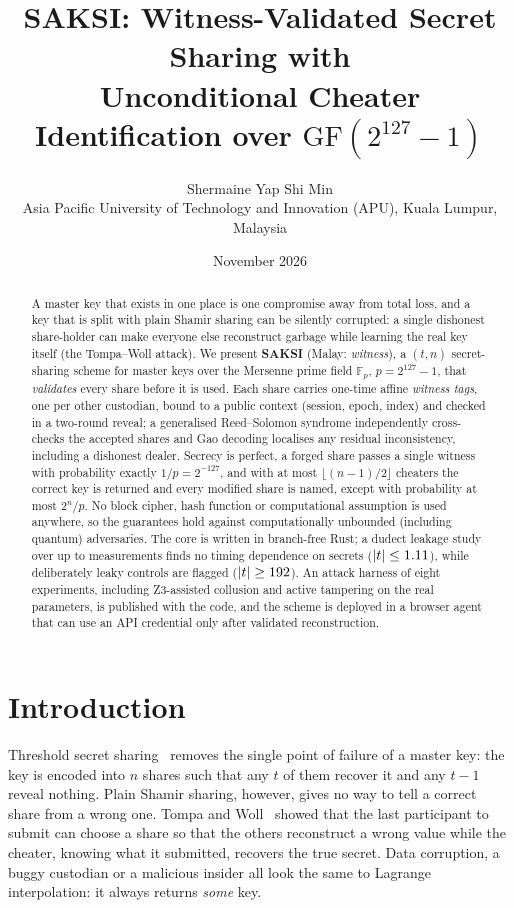 \documentclass[11pt,a4paper]{article}
\title{\textbf{SAKSI}: Witness-Validated Secret Sharing with\\Unconditional Cheater Identification over $\mathrm{GF}(2^{127}-1)$}
\author{Shermaine Yap Shi Min\\[2pt]
\small Asia Pacific University of Technology and Innovation (APU), Kuala Lumpur, Malaysia}
\date{November 2026}
\theoremstyle{plain}
\theoremstyle{definition}
\newcommand{\F}{\mathbb{F}_p}
\begin{document}
\maketitle

\begin{abstract}
A master key that exists in one place is one compromise away from total loss, and a key that is
split with plain Shamir sharing can be silently corrupted: a single dishonest share-holder can
make everyone else reconstruct garbage while learning the real key itself (the Tompa--Woll
attack). We present \textbf{SAKSI} (Malay: \emph{witness}), a $(t,n)$ secret-sharing scheme for
master keys over the Mersenne prime field $\F$, $p=2^{127}-1$, that \emph{validates} every share
before it is used. Each share carries one-time affine \emph{witness tags}, one per other custodian,
bound to a public context (session, epoch, index) and checked in a two-round reveal; a
generalised Reed--Solomon syndrome independently cross-checks the accepted shares and Gao decoding
localises any residual inconsistency, including a dishonest dealer. Secrecy is perfect, a forged
share passes a single witness with probability exactly $1/p=2^{-127}$, and with at most
$\lfloor (n-1)/2\rfloor$ cheaters the correct key is returned and every modified share is named,
except with probability at most $2^n/p$. No block cipher, hash function or computational
assumption is used anywhere, so the guarantees hold against computationally unbounded (including
quantum) adversaries. The core is written in branch-free Rust; a dudect leakage study over up to
\TimingSamples{} measurements finds no timing dependence on secrets ($|t|\le1.11$),
while deliberately leaky controls are flagged ($|t|\ge192$). An attack harness of eight
experiments, including Z3-assisted collusion and active tampering on the real parameters, is
published with the code, and the scheme is deployed in a browser agent that can use an API
credential only after validated reconstruction.
\end{abstract}

\section{Introduction}\label{sec:intro}

Threshold secret sharing~\cite{shamir79,blakley79} removes the single point of failure of a master
key: the key is encoded into $n$ shares such that any $t$ of them recover it and any $t-1$ reveal
nothing. Plain Shamir sharing, however, gives no way to tell a correct share from a wrong one.
Tompa and Woll~\cite{tompawoll88} showed that the last participant to submit can choose a share so
that the others reconstruct a wrong value while the cheater, knowing what it submitted, recovers
the true secret. Data corruption, a buggy custodian or a malicious insider all look the same to
Lagrange interpolation: it always returns \emph{some} key.
\end{document}

